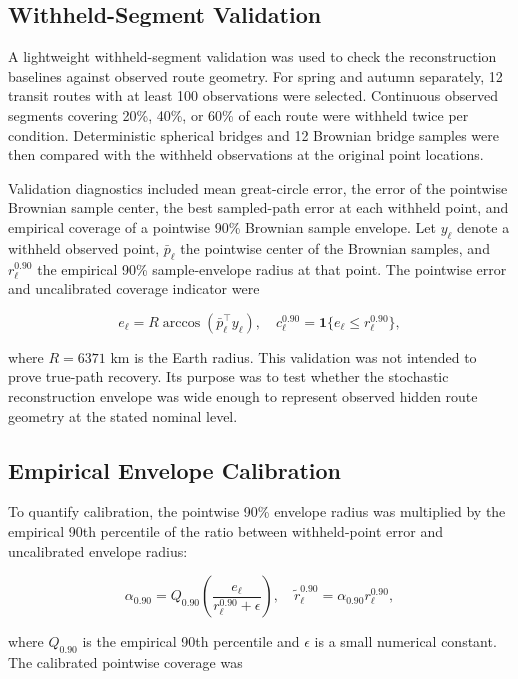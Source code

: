 \subsection{Withheld-Segment Validation}\label{withheld-segment-validation-methods}

A lightweight withheld-segment validation was used to check the reconstruction baselines against observed route geometry. For spring and autumn separately, 12 transit routes with at least 100 observations were selected. Continuous observed segments covering 20\%, 40\%, or 60\% of each route were withheld twice per condition. Deterministic spherical bridges and 12 Brownian bridge samples were then compared with the withheld observations at the original point locations.

Validation diagnostics included mean great-circle error, the error of the pointwise Brownian sample center, the best sampled-path error at each withheld point, and empirical coverage of a pointwise 90\% Brownian sample envelope. Let \(y_\ell\) denote a withheld observed point, \(\bar p_\ell\) the pointwise center of the Brownian samples, and \(r_\ell^{0.90}\) the empirical 90\% sample-envelope radius at that point. The pointwise error and uncalibrated coverage indicator were

\[
e_\ell = R \arccos(\bar p_\ell^\top y_\ell),
\quad
c_\ell^{0.90} = \mathbf{1}\{e_\ell \le r_\ell^{0.90}\},
\]

where \(R=6371\) km is the Earth radius. This validation was not intended to prove true-path recovery. Its purpose was to test whether the stochastic reconstruction envelope was wide enough to represent observed hidden route geometry at the stated nominal level.

\subsection{Empirical Envelope Calibration}\label{empirical-envelope-calibration}

To quantify calibration, the pointwise 90\% envelope radius was multiplied by the empirical 90th percentile of the ratio between withheld-point error and uncalibrated envelope radius:

\[
\alpha_{0.90}
= Q_{0.90}\left(\frac{e_\ell}{r_\ell^{0.90}+\epsilon}\right),
\quad
\tilde r_\ell^{0.90} = \alpha_{0.90} r_\ell^{0.90},
\]

where \(Q_{0.90}\) is the empirical 90th percentile and \(\epsilon\) is a small numerical constant. The calibrated pointwise coverage was

